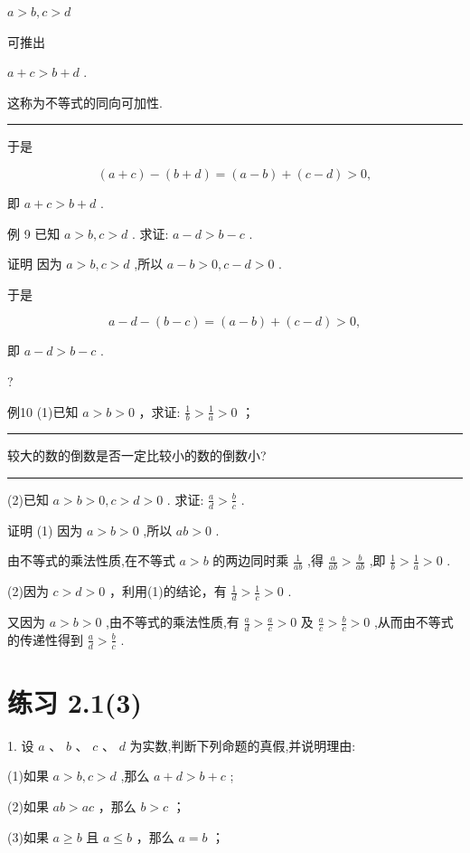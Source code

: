 \documentclass[10pt]{article}
\newcommand{\HRule}{\begin{center}\rule{0.9\linewidth}{0.2mm}\end{center}}
\begin{document}
\(a > b,c > d\)

可推出

\(a + c > b + d\) .

这称为不等式的同向可加性.

\HRule

于是

\[
\left( {a + c}\right)  - \left( {b + d}\right)  = \left( {a - b}\right)  + \left( {c - d}\right)  > 0,
\]

即 \(a + c > b + d\) .

例 9 已知 \(a > b,c > d\) . 求证: \(a - d > b - c\) .

证明 因为 \(a > b,c > d\) ,所以 \(a - b > 0,c - d > 0\) .

于是

\[
a - d - \left( {b - c}\right)  = \left( {a - b}\right)  + \left( {c - d}\right)  > 0,
\]

即 \(a - d > b - c\) .

?

例10 (1)已知 \(a > b > 0\) ，求证: \(\frac{1}{b} > \frac{1}{a} > 0\) ；

\HRule

较大的数的倒数是否一定比较小的数的倒数小?

\HRule

(2)已知 \(a > b > 0,c > d > 0\) . 求证: \(\frac{a}{d} > \frac{b}{c}\) .

证明 (1) 因为 \(a > b > 0\) ,所以 \({ab} > 0\) .

由不等式的乘法性质,在不等式 \(a > b\) 的两边同时乘 \(\frac{1}{ab}\) ,得 \(\frac{a}{ab} > \frac{b}{ab}\) ,即 \(\frac{1}{b} > \frac{1}{a} > 0\) .

(2)因为 \(c > d > 0\) ，利用(1)的结论，有 \(\frac{1}{d} > \frac{1}{c} > 0\) .

又因为 \(a > b > 0\) ,由不等式的乘法性质,有 \(\frac{a}{d} > \frac{a}{c} > 0\) 及 \(\frac{a}{c} > \frac{b}{c} > 0\) ,从而由不等式的传递性得到 \(\frac{a}{d} > \frac{b}{c}\) .

\section*{练习 2.1(3)}

1. 设 \(a\text{ 、 }b\text{ 、 }c\text{ 、 }d\) 为实数,判断下列命题的真假,并说明理由:

(1)如果 \(a > b,c > d\) ,那么 \(a + d > b + c\) ;

(2)如果 \({ab} > {ac}\) ，那么 \(b > c\) ；

(3)如果 \(a \geq  b\) 且 \(a \leq  b\) ，那么 \(a = b\) ；
\end{document}
